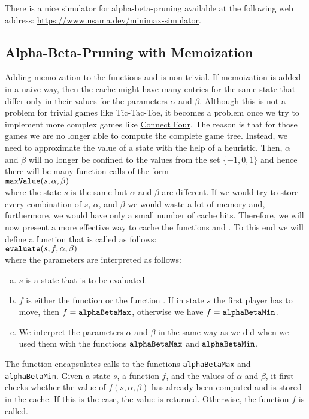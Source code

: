 \remark
There is a nice simulator for alpha-beta-pruning available at the following web address:
\href{https://www.usama.dev/minimax-simulator}{https://www.usama.dev/minimax-simulator}.

\subsection{Alpha-Beta-Pruning with Memoization}
Adding memoization to the functions  and  is non-trivial.
If memoization is added in a naive way, then the cache might have many entries for the same state that differ
only in their values for the parameters $\alpha$ and $\beta$.  Although this is not a problem for trivial games
like Tic-Tac-Toe, it becomes a problem once we try to implement more complex games like
\href{https://en.wikipedia.org/wiki/Connect_Four}{Connect Four}. The reason is that for those games we are no
longer able to compute the complete game tree.  Instead, we need to approximate the value of a state with the
help of a heuristic.  Then, $\alpha$ and $\beta$ will no longer be confined to the values from the set
$\{-1,0,1\}$ and hence there will be many function calls of the form
\\[0.2cm]
\hspace*{1.3cm}
$\texttt{maxValue}(s, \alpha, \beta)$ 
\\[0.2cm]
where the state $s$ is the same but $\alpha$ and $\beta$ are different.  If we would try to store every
combination of $s$, $\alpha$, and $\beta$ we would waste a lot of memory and, furthermore, we would have only a
small number of cache hits.  Therefore, we will now present a more effective way to cache the functions
 and .  To this end we will define a function  that is
called as follows:
\\[0.2cm]
\hspace*{1.3cm}
$\texttt{evaluate}(s, f, \alpha, \beta)$
\\[0.2cm]
where the parameters are interpreted as follows:
\begin{enumerate}[(a)]
\item $s$ is a state that is to be evaluated.
\item $f$ is either the function  or the function .
      If in state $s$ the first player has to move, then $f = \texttt{alphaBetaMax}$, otherwise we have
      $f = \texttt{alphaBetaMin}$.
\item We interpret the parameters $\alpha$ and $\beta$ in the same way as we did when we used them with
      the functions $\texttt{alphaBetaMax}$ and $\texttt{alphaBetaMin}$.
\end{enumerate}
The function  encapsulates calls to the functions \texttt{alphaBetaMax} and
\texttt{alphaBetaMin}.  Given a state $s$, a function $f$, and the values of $\alpha$ and $\beta$, 
it first checks whether the value of $f(s, \alpha, \beta)$ has already been computed and is stored in the
cache.  If this is the case, the value is returned.  Otherwise, the function $f$ is called.  

